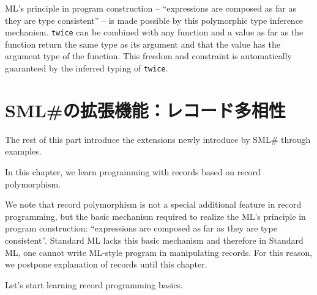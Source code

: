 \documentclass{jbook}
\newif\ifjp
\newcommand{\txt}[2]{#1}
\newcommand{\smlsharp}{SML\#}
\begin{document}
	ML's principle in program construction -- ``expressions are
composed as far as they are type consistent'' -- is made possible by
this polymorphic type inference mechanism.
	{\tt twice} can be combined with any function and a value as far
as the function return the same type as its argument and that the value
has the argument type of the function.
	This freedom and constraint is automatically guaranteed by the
inferred typing of {\tt twice}.
\fi%

\chapter{
\txt{\smlsharp{}の拡張機能：レコード多相性}
    {\smlsharp{} feature: record polymorphism}
}
\label{chap:tutorialRecordpolymorphism}

\ifjp%
	本章以降の各章では，
\smlsharp{}で導入されたStandard MLの拡張機能を例を用いて説明します．

	まず本章では，レコード多相性を基礎としたMLでのレコードを用いたプ
ログラミングを学びます．
	レコード多相性は，特別な付加機能ではなく，MLの原則「式は型が正し
い限り自由に組み合わせることができる」に従ってレコードを含むプログラミ
ングを行う上での基本機能です．
	Standard MLにはこの機能が欠けているため，レコードの特性を生かし
たMLスタイルのプログラムが書けませんでした．
	この理由から，本書では，レコードの説明を遅延していました．
	まず，レコードの基礎から学びましょう．
\else%
	The rest of this part introduce the extensions newly introduce
by \smlsharp{} through examples.

	In this chapter, we learn programming with records based on 
record polymorphism.

	We note that record polymorphism is not a special additional
feature in record programming, but the basic mechanism required to
realize the ML's principle in program construction: ``expressions are
composed as far as they are type consistent''.
	Standard ML lacks this basic mechanism and therefore in Standard
ML, one cannot write ML-style program in manipulating records.
	For this reason, we postpone explanation of records until this
chapter.

	Let's start learning record programming basics.
\fi%
\end{document}
